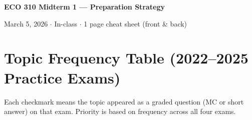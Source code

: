 \documentclass[10pt]{article}
\begin{document}
{\centering\LARGE\bfseries ECO 310 Midterm 1 --- Preparation Strategy\par}
\vspace{2pt}
{\centering March 5, 2026 $\cdot$ In-class $\cdot$ 1 page cheat sheet (front \& back)\par}
\vspace{8pt}

\section{Topic Frequency Table (2022--2025 Practice Exams)}

Each checkmark means the topic appeared as a graded question (MC or short answer) on that exam. Priority is based on frequency across all four exams.

\vspace{4pt}
\end{document}

